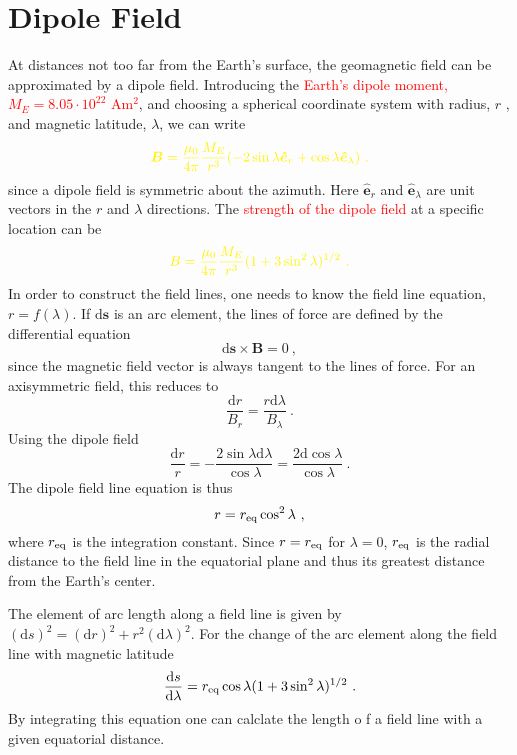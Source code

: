 \documentclass[12pt,a4paper]{article}
\renewcommand{\vec}[1]{\boldsymbol{#1}}
\newcommand{\dif}{\mathrm{d}}
\begin{document}
\section{Dipole Field}
At distances not too far from the Earth's surface, the geomagnetic field can be approximated by a dipole field. Introducing the \textcolor{red}{Earth's dipole moment, $M_E = 8.05 \cdot 10^{22}$ Am$^2$}, and choosing a spherical coordinate system with radius, $r$ , and magnetic latitude, $\lambda$, we can write
\begin{equation}
\color{yellow} \vec{B} = \dfrac{\mu_0}{4\pi} \dfrac{M_E}{r^3} (-2 \sin \lambda \vec{\hat{e}}_r +\cos \lambda \vec{\hat{e}}_\lambda) ~.
\end{equation}
since a dipole field is symmetric about the azimuth. Here $\vec{\hat{e}}_r$ and $\vec{\hat{e}}_\lambda$ are unit vectors in the $r$ and $\lambda$ directions. The \textcolor{red}{strength of the dipole field} at a specific location can be 
\begin{equation}
\color{yellow} B = \dfrac{\mu_0}{4\pi} \dfrac{M_E}{r^3} (1+3\sin^2 \lambda)^{1/2} ~.
\end{equation}
In order to construct the field lines, one needs to know the field line equation, $r = f(\lambda)$. If $\dif \vec{s}$ is an arc element, the lines of force are defined by the differential equation
\begin{equation}
\dif \vec{s} \times \vec{B} = 0 ~,
\end{equation}
since the magnetic field vector is always tangent to the lines of force. For an axisymmetric field, this reduces to
\begin{equation}
\dfrac{\dif r}{B_r} = \dfrac{r \dif \lambda}{B_\lambda} ~.
\end{equation}
Using the dipole field
\begin{equation}
\dfrac{\dif r}{r} = -\dfrac{2 \sin \lambda \dif \lambda}{\cos \lambda} = \dfrac{2 \dif \cos \lambda}{\cos \lambda} ~.
\end{equation}
The dipole field line equation is thus 
\begin{equation}
r = r_{\rm eq} \cos^2 \lambda ~,
\end{equation}
where $r_{\rm eq}$ is the integration constant. Since $r =r_{\rm eq}$ for $\lambda = 0$, $r_{\rm eq}$ is the radial distance to the field line in the equatorial plane and thus its greatest distance from the Earth's center.

The element of arc length along a field line is given by $(\dif s)^2 = (\dif r)^2 +r^2 (\dif \lambda)^2$. For the change of the arc element along the field line with magnetic latitude
\begin{equation}
\dfrac{\dif s}{\dif \lambda} = r_{\rm eq} \cos \lambda (1+3\sin^2 \lambda)^{1/2} ~.
\end{equation}
By integrating this equation one can calclate the length o f a field line with a given equatorial distance.
\end{document}

